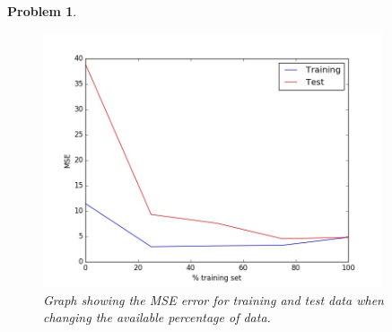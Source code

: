 \documentclass[12pt]{article}
\newtheorem{problem}{Problem}%
\begin{document}
\begin{problem}
\begin{enumerate}
\begin{figure}[!htbp]
\centering
\includegraphics[width=10cm]{HWp2_Percentag_train.jpg}
\caption{Graph showing the MSE error for training and test data when changing the available percentage of data.}
\end{figure}
\end{enumerate}
\end{problem}
\end{document}
